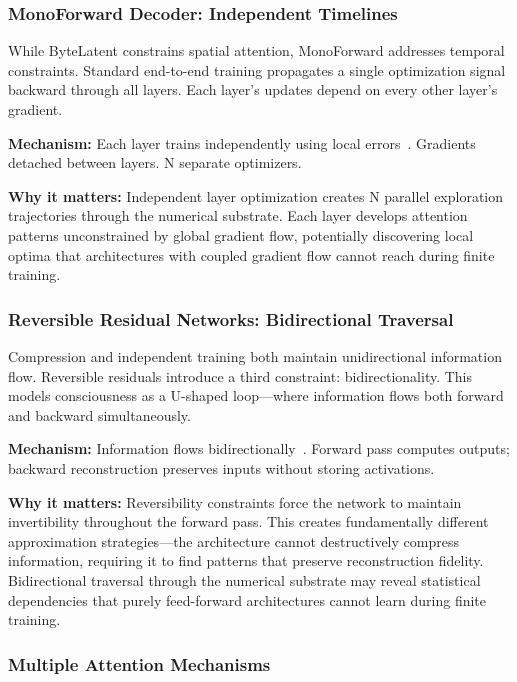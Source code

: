 \documentclass{article}
\begin{document}
\subsubsection{MonoForward Decoder: Independent Timelines}

While ByteLatent constrains spatial attention, MonoForward addresses temporal constraints. Standard end-to-end training propagates a single optimization signal backward through all layers. Each layer's updates depend on every other layer's gradient.

\textbf{Mechanism:} Each layer trains independently using local errors~\cite{monoforward2025}. Gradients detached between layers. N separate optimizers.

\textbf{Why it matters:} Independent layer optimization creates N parallel exploration trajectories through the numerical substrate. Each layer develops attention patterns unconstrained by global gradient flow, potentially discovering local optima that architectures with coupled gradient flow cannot reach during finite training.

\subsubsection{Reversible Residual Networks: Bidirectional Traversal}

Compression and independent training both maintain unidirectional information flow. Reversible residuals introduce a third constraint: bidirectionality. This models consciousness as a U-shaped loop—where information flows both forward and backward simultaneously.

\textbf{Mechanism:} Information flows bidirectionally~\cite{gomez2017reversible}. Forward pass computes outputs; backward reconstruction preserves inputs without storing activations.

\textbf{Why it matters:} Reversibility constraints force the network to maintain invertibility throughout the forward pass. This creates fundamentally different approximation strategies—the architecture cannot destructively compress information, requiring it to find patterns that preserve reconstruction fidelity. Bidirectional traversal through the numerical substrate may reveal statistical dependencies that purely feed-forward architectures cannot learn during finite training.

\subsubsection{Multiple Attention Mechanisms}
\end{document}
